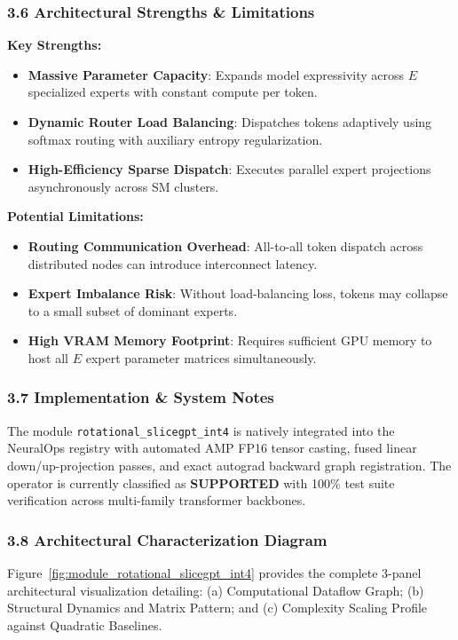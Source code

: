 \subsubsection*{3.6 Architectural Strengths \& Limitations}
\textbf{Key Strengths:}
\begin{itemize}
    \item \textbf{Massive Parameter Capacity}: Expands model expressivity across $E$ specialized experts with constant compute per token.
    \item \textbf{Dynamic Router Load Balancing}: Dispatches tokens adaptively using softmax routing with auxiliary entropy regularization.
    \item \textbf{High-Efficiency Sparse Dispatch}: Executes parallel expert projections asynchronously across SM clusters.
\end{itemize}

\textbf{Potential Limitations:}
\begin{itemize}
    \item \textbf{Routing Communication Overhead}: All-to-all token dispatch across distributed nodes can introduce interconnect latency.
    \item \textbf{Expert Imbalance Risk}: Without load-balancing loss, tokens may collapse to a small subset of dominant experts.
    \item \textbf{High VRAM Memory Footprint}: Requires sufficient GPU memory to host all $E$ expert parameter matrices simultaneously.
\end{itemize}

\subsubsection*{3.7 Implementation \& System Notes}
The module \texttt{rotational\_slicegpt\_int4} is natively integrated into the NeuralOps registry with automated AMP FP16 tensor casting, fused linear down/up-projection passes, and exact autograd backward graph registration. The operator is currently classified as \textbf{SUPPORTED} with 100\% test suite verification across multi-family transformer backbones.

\subsubsection*{3.8 Architectural Characterization Diagram}
Figure~\ref{fig:module_rotational_slicegpt_int4} provides the complete 3-panel architectural visualization detailing: (a) Computational Dataflow Graph; (b) Structural Dynamics and Matrix Pattern; and (c) Complexity Scaling Profile against Quadratic Baselines.

